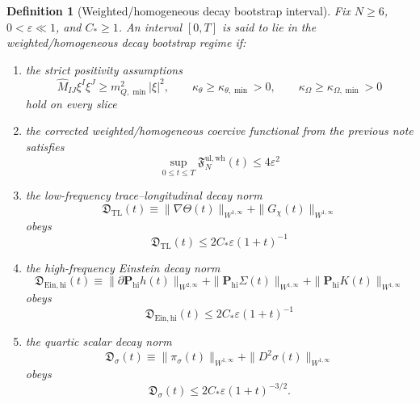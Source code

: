 \documentclass[11pt]{article}
\newtheorem{definition}{Definition}
\begin{document}
\begin{definition}[Weighted/homogeneous decay bootstrap interval]
\label{def:decayboot}
Fix \(N\ge 6\), \(0<\varepsilon\ll 1\), and \(C_\ast\ge 1\). An interval \([0,T]\) is said to lie in the \emph{weighted/homogeneous decay bootstrap regime} if:
\begin{enumerate}
    \item the strict positivity assumptions
    \begin{equation}
    \widehat M_{IJ}\xi^I\xi^J\ge m_{Q,\min}^2|\xi|^2,
    \qquad
    \kappa_\theta\ge \kappa_{\theta,\min}>0,
    \qquad
    \kappa_\Omega\ge \kappa_{\Omega,\min}>0
    \label{eq:strict}
    \end{equation}
    hold on every slice
    \item the corrected weighted/homogeneous coercive functional from the previous note satisfies
    \begin{equation}
    \sup_{0\le t\le T}\mathfrak F_N^{\mathrm{ul,wh}}(t)\le 4\varepsilon^2
    \label{eq:energyboot}
    \end{equation}
    \item the low-frequency trace--longitudinal decay norm
    \begin{equation}
    \mathfrak D_{\mathrm{TL}}(t)
    \equiv
    \|\nabla\Theta(t)\|_{W^{1,\infty}}
    + \|G_\chi(t)\|_{W^{1,\infty}}
    \label{eq:DTL}
    \end{equation}
    obeys
    \begin{equation}
    \mathfrak D_{\mathrm{TL}}(t)\le 2C_\ast\varepsilon(1+t)^{-1}
    \label{eq:DTLboot}
    \end{equation}
    \item the high-frequency Einstein decay norm
    \begin{equation}
    \mathfrak D_{\mathrm{Ein,hi}}(t)
    \equiv
    \|\partial \mathbf P_{\mathrm{hi}}h(t)\|_{W^{2,\infty}}
    + \|\mathbf P_{\mathrm{hi}}\Sigma(t)\|_{W^{1,\infty}}
    + \|\mathbf P_{\mathrm{hi}}K(t)\|_{W^{1,\infty}}
    \label{eq:DEin}
    \end{equation}
    obeys
    \begin{equation}
    \mathfrak D_{\mathrm{Ein,hi}}(t)\le 2C_\ast\varepsilon(1+t)^{-1}
    \label{eq:DEinboot}
    \end{equation}
    \item the quartic scalar decay norm
    \begin{equation}
    \mathfrak D_\sigma(t)
    \equiv
    \|\pi_\sigma(t)\|_{W^{1,\infty}}
    + \|D^2\sigma(t)\|_{W^{1,\infty}}
    \label{eq:Dsigma}
    \end{equation}
    obeys
    \begin{equation}
    \mathfrak D_\sigma(t)\le 2C_\ast\varepsilon(1+t)^{-3/2}.
    \label{eq:Dsigmaboot}
    \end{equation}
\end{enumerate}
\end{definition}
\end{document}
